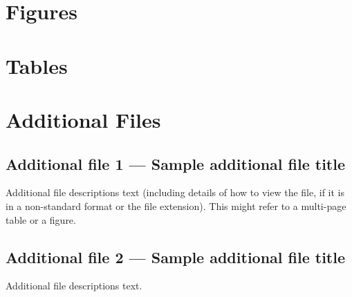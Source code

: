 \documentclass{bmcart}
\begin{document}
\begin{backmatter}




\section*{Figures}
%


\section*{Tables}



\section*{Additional Files}
  \subsection*{Additional file 1 --- Sample additional file title}
    Additional file descriptions text (including details of how to
    view the file, if it is in a non-standard format or the file extension).  This might
    refer to a multi-page table or a figure.

  \subsection*{Additional file 2 --- Sample additional file title}
    Additional file descriptions text.

\end{backmatter}
\end{document}
